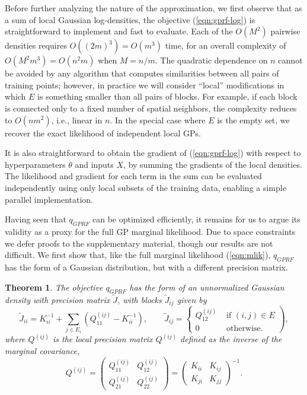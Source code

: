 \documentclass{article}
\newtheorem{theorem}{Theorem}
\begin{document}
Before further analyzing the nature of the approximation, we first
observe that as a sum of local Gaussian log-densities, the objective (\ref{eqn:gprf-log})
is straightforward to implement and fast to evaluate. Each of the $O(M^2)$
pairwise densities requires $O((2m)^3) = O(m^3)$ time, for an overall complexity of
$O(M^2m^3) = O(n^2m)$ when $M=n/m$. The quadratic dependence on $n$ cannot
be avoided by any algorithm that computes similarities between all
pairs of training points; however, in practice we will consider ``local''
modifications in which $E$ is something smaller than all
pairs of blocks. For example, if each block is connected only to a
fixed number of spatial neighbors, the complexity reduces
to $O(nm^2)$, i.e., linear in $n$. In the special case where $E$ is
the empty set, we recover the exact likelihood of independent local GPs.

It is also straightforward to obtain the gradient of
(\ref{eqn:gprf-log}) with respect to hyperparameters $\theta$ and inputs $X$, by summing
the gradients of the local densities. The likelihood and gradient for each term in the sum
can be evaluated independently using only local subsets of the
training data, enabling a simple parallel implementation. 

Having seen that $q_{GPRF}$ can be optimized efficiently, it remains
for us to argue its validity as a proxy for the full GP marginal
likelihood. Due to space constraints we
defer proofs to the supplementary material, though our results are not
difficult. We first show that, like the full marginal likelihood (\ref{eqn:mlik}),
$q_{GPRF}$ has the form of a Gaussian distribution, but with a
different precision matrix.

\begin{theorem}
The objective $q_{GPRF}$ has the form of an unnormalized Gaussian density
with precision matrix $\tilde{J}$, with blocks $\tilde{J}_{ij}$ given by
\begin{equation}
\tilde{J}_{ii} = K_{ii}^{-1} + \sum_{j\in E_i} \left(Q^{(ij)}_{11}
    - K_{ii}^{-1}\right), \qquad \tilde{J}_{ij} =
  \left\{\begin{array}{ll}Q^{(ij)}_{12} & \text{ if } (i,j) \in E\\0
    & \text{ otherwise.}\end{array}\right),\label{eqn:approx-precision}
\end{equation}
where  $Q^{(ij)}$ is the {\em local precision  matrix} $Q^{(ij)}$
defined as the inverse of the marginal covariance,
\[Q^{(ij)} = \left(\begin{array}{cc} Q^{(ij)}_{11} &  Q^{(ij)}_{12}\\
  Q^{(ij)}_{21}  & Q^{(ij)}_{22}\end{array}\right) = \left(\begin{array}{cc} K_{ii} &  K_{ij}\\
  K_{ji}  & K_{jj}\end{array}\right)^{-1}.\]
\end{theorem}
\end{document}
